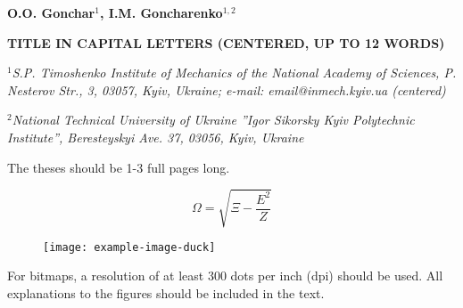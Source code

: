 \documentclass[a4paper,10pt]{article}
\begin{document}
\pagestyle{empty}
\begin{center}
\textbf{O.O. Gonchar$^1$, I.M. Goncharenko$^{1,2}$}
\bigskip

\textbf{TITLE IN CAPITAL LETTERS (CENTERED, UP TO 12 WORDS)}
\bigskip

\textit{\fontsize{9}{9}\selectfont$^1$S.P. Timoshenko Institute of Mechanics of the National Academy of Sciences, P. Nesterov Str., 3, 03057, Kyiv, Ukraine;
e-mail: email@inmech.kyiv.ua (centered)}

\textit{\fontsize{9}{9}\selectfont
$^2$National Technical University of Ukraine ''Igor Sikorsky Kyiv Polytechnic Institute'', Beresteyskyi Ave. 37, 03056, Kyiv, Ukraine}
\end{center}

The theses should be 1-3 full pages long.

\begin{equation}
 \Omega=\sqrt{\Xi-\dfrac{E^2}{Z}}
\end{equation}


\begin{figure}[ht]
\centering
\texttt{[image: example-image-duck]}
\caption{}\label{example}
\end{figure}

For bitmaps, a resolution of at least 300 dots per inch (dpi) should be used. All explanations to the figures should be included in the text.
\bigskip
\end{document}
